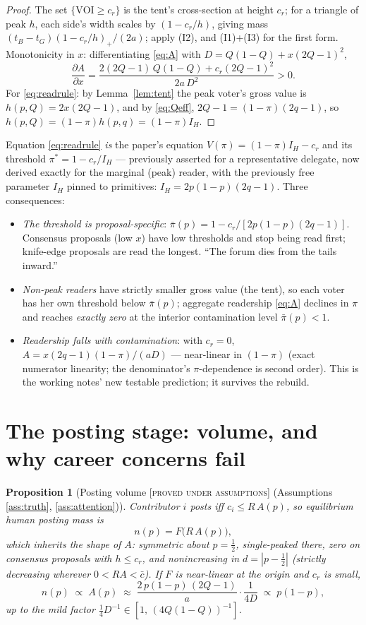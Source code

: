 \documentclass[11pt]{article}
\newtheorem{proposition}{Proposition}
\theoremstyle{remark}
\newcommand{\statusPA}{\textsc{[proved under assumptions]}}
\begin{document}
\begin{proof}
The set $\{\mathrm{VOI}\ge c_r\}$ is the tent's cross-section at height $c_r$;
for a triangle of peak $h$, each side's width scales by $(1-c_r/h)$, giving mass
$(t_B-t_G)(1-c_r/h)_+/(2a)$; apply (I2), and (I1)+(I3) for the first form.
Monotonicity in $x$: differentiating \eqref{eq:A} with $D=Q(1-Q)+x(2Q-1)^2$,
\[
\frac{\partial A}{\partial x}
=\frac{2(2Q-1)\,Q(1-Q)+c_r(2Q-1)^2}{2a\,D^2}>0 .
\]
For \eqref{eq:readrule}: by Lemma~\ref{lem:tent} the peak voter's gross value is
$h(p,Q)=2x(2Q-1)$, and by \eqref{eq:Qeff}, $2Q-1=(1-\pi)(2q-1)$, so
$h(p,Q)=(1-\pi)h(p,q)=(1-\pi)I_H$.
\end{proof}

Equation \eqref{eq:readrule} \emph{is} the paper's equation
$V(\pi)=(1-\pi)I_H-c_r$ and its threshold $\pi^*=1-c_r/I_H$ --- previously
asserted for a representative delegate, now derived exactly for the marginal
(peak) reader, with the previously free parameter $I_H$ pinned to primitives:
$I_H=2p(1-p)(2q-1)$. Three consequences:
\begin{itemize}[itemsep=1pt]
\item \emph{The threshold is proposal-specific}: $\bar\pi(p)=1-c_r/[2p(1-p)(2q-1)]$.
Consensus proposals (low $x$) have low thresholds and stop being read first;
knife-edge proposals are read the longest. ``The forum dies from the tails
inward.''
\item \emph{Non-peak readers} have strictly smaller gross value (the tent), so
each voter has her own threshold below $\bar\pi(p)$; aggregate readership
\eqref{eq:A} declines in $\pi$ and reaches \emph{exactly zero} at the interior
contamination level $\bar\pi(p)<1$.
\item \emph{Readership falls with contamination}: with $c_r=0$,
$A=x(2q-1)(1-\pi)/(aD)$ --- near-linear in $(1-\pi)$ (exact numerator linearity;
the denominator's $\pi$-dependence is second order). This is the working notes'
new testable prediction; it survives the rebuild.
\end{itemize}

\section{The posting stage: volume, and why career concerns fail}
\label{sec:post}

\begin{proposition}[Posting volume \statusPA{} (Assumptions \ref{ass:truth}, \ref{ass:attention})]
\label{prop:volume}
Contributor $i$ posts iff $c_i\le R\,A(p)$, so equilibrium human posting mass is
\begin{equation}\label{eq:n}
n(p)=F\bigl(R\,A(p)\bigr),
\end{equation}
which inherits the shape of $A$: symmetric about $p=\tfrac12$, single-peaked
there, zero on consensus proposals with $h\le c_r$, and nonincreasing in
$d=|p-\tfrac12|$ (strictly decreasing wherever $0<RA<\bar c$). If $F$ is
near-linear at the origin and $c_r$ is small,
\[
n(p)\;\propto\;A(p)\;\approx\;\frac{2\,p(1-p)\,(2Q-1)}{a}\cdot\frac{1}{4D}
\;\propto\; p(1-p),
\]
up to the mild factor $\tfrac14 D^{-1}\in[1,\,(4Q(1-Q))^{-1}]$.
\end{proposition}
\end{document}
